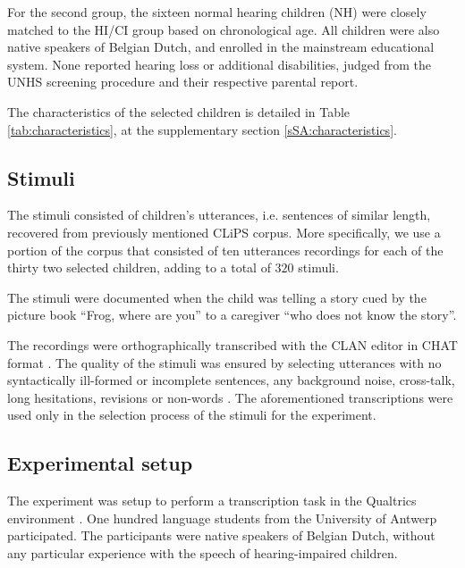 For the second group, the sixteen normal hearing children (NH) were closely matched to the HI/CI group based on chronological age. All children were also native speakers of Belgian Dutch, and enrolled in the mainstream educational system. None reported hearing loss or additional disabilities, judged from the UNHS screening procedure and their respective parental report.

The characteristics of the selected children is detailed in Table \ref{tab:characteristics}, at the supplementary section \ref{sSA:characteristics}. 
%
%
\subsection{Stimuli} \label{sS:stimuli}
%
The stimuli consisted of children's utterances, i.e. sentences of similar length, recovered from previously mentioned CLiPS corpus. More specifically, we use a portion of the corpus that consisted of ten utterances recordings for each of the thirty two selected children, adding to a total of $320$ stimuli. 

The stimuli were documented when the child was telling a story cued by the picture book ``Frog, where are you'' \citep{Mayer_1969} to a caregiver ``who does not know the story''. 

The recordings were orthographically transcribed with the CLAN editor in CHAT format \cite{MacWhinney_2020}. The quality of the stimuli was ensured by selecting utterances with no syntactically ill-formed or incomplete sentences, any background noise, cross-talk, long hesitations, revisions or non-words \citep{Boonen_et_al_2021}. The aforementioned transcriptions were used only in the selection process of the stimuli for the experiment. 
%
\begin{comment}
	under the Design of Experiments (DoE) literature, we would say we have $32$ experimental units with $10$ replicate runs each, making a total of $320$ experimental runs. As it is defined in \citet{Lawson_2015}, an experimental unit is the item under study upon which something is changed, while a replicate run is the experiment conducted with the same factor settings, but using different experimental units. 
\end{comment}
%
%
\subsection{Experimental setup} \label{sS:setup}
%
The experiment was setup to perform a transcription task in the Qualtrics environment \cite{Qualtrics_2005}. One hundred language students from the University of Antwerp participated. The participants were native speakers of Belgian Dutch, without any particular experience with the speech of hearing-impaired children.

